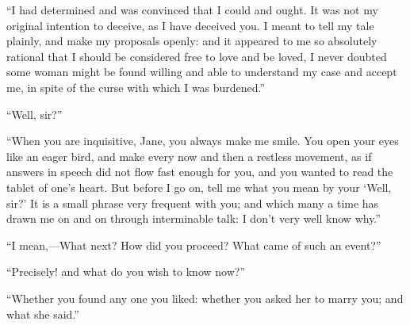 \enquote{I had determined and was convinced that I could and ought. It
	was not my original intention to deceive, as I have deceived you. I
	meant to tell my tale plainly, and make my proposals openly: and it
	appeared to me so absolutely rational that I should be considered free
	to love and be loved, I never doubted some woman might be found willing
	and able to understand my case and accept me, in spite of the curse with
	which I was burdened.}

\enquote{Well, sir?}

\enquote{When you are inquisitive, Jane, you always make me smile. You
	open your eyes like an eager bird, and make every now and then a
	restless movement, as if answers in speech did not flow fast enough for
	you, and you wanted to read the tablet of one's heart. But before I go
	on, tell me what you mean by your \enquote{Well, sir?} It is a small
	phrase very frequent with you; and which many a time has drawn me on and
	on through interminable talk: I don't very well know why.}

\enquote{I mean,---What next? How did you proceed? What came of such
	an event?}

\enquote{Precisely! and what do you wish to know now?}

\enquote{Whether you found any one you liked: whether you asked her to
	marry you; and what she said.}

